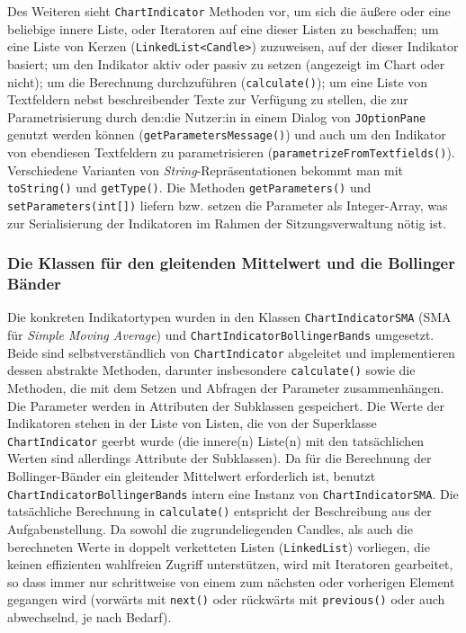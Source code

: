 \documentclass[fontsize=12pt, paper=a4, pagesize=auto, twoside=false, DIV=11, draft=false]{scrartcl}
\begin{document}
Des Weiteren sieht \texttt{ChartIndicator} Methoden vor, um sich die äußere oder eine beliebige innere Liste, oder Iteratoren auf eine dieser Listen zu beschaffen; um eine Liste von Kerzen (\texttt{LinkedList<Candle>}) zuzuweisen, auf der dieser Indikator basiert; um den Indikator aktiv oder passiv zu setzen (angezeigt im Chart oder nicht); um die Berechnung durchzuführen (\texttt{calculate()}); um eine Liste von Textfeldern nebst beschreibender Texte zur Verfügung zu stellen, die zur Parametrisierung durch den:die Nutzer:in in einem Dialog von \texttt{JOptionPane} genutzt werden können (\texttt{getParametersMessage()}) und auch um den Indikator von ebendiesen Textfeldern zu parametrisieren (\texttt{para\-me\-trize\-From\-Text\-fields()}). Verschiedene Varianten von \textit{String}-Repräsentationen bekommt man mit \texttt{toString()} und \texttt{getType()}. Die Methoden \texttt{getParameters()} und \texttt{setParameters(int[])} liefern bzw. setzen die Parameter als Integer-Array, was zur Serialisierung der Indikatoren im Rahmen der Sitzungsverwaltung nötig ist. 

\subsubsection{Die Klassen für den gleitenden Mittelwert und die Bollinger Bänder}
Die konkreten Indikatortypen wurden in den Klassen \texttt{ChartIndicatorSMA} (SMA für \textit{Simple Moving Average}) und \texttt{ChartIndicatorBollingerBands} umgesetzt. Beide sind selbstverständlich von \texttt{ChartIndicator} abgeleitet und implementieren dessen abstrakte Methoden, darunter insbesondere \texttt{calculate()} sowie die Methoden, die mit dem Setzen und Abfragen der Parameter zusammenhängen. Die Parameter werden in Attributen der Subklassen gespeichert. Die Werte der Indikatoren stehen in der Liste von Listen, die von der Superklasse \texttt{ChartIndicator} geerbt wurde (die \glqq innere(n)\grqq{} Liste(n) mit den tatsächlichen Werten sind allerdings Attribute der Subklassen). Da für die Berechnung der Bollinger-Bänder ein gleitender Mittelwert erforderlich ist, benutzt \texttt{ChartIndicatorBollingerBands} intern eine Instanz von \texttt{ChartIndicatorSMA}. Die tatsächliche Berechnung in \texttt{calculate()} entspricht der Beschreibung aus der Aufgabenstellung. Da sowohl die zugrundeliegenden Candles, als auch die berechneten Werte in doppelt verketteten Listen (\texttt{LinkedList}) vorliegen, die keinen effizienten wahlfreien Zugriff unterstützen, wird mit Iteratoren gearbeitet, so dass immer nur schrittweise von einem zum nächsten oder vorherigen Element gegangen wird (vorwärts mit \texttt{next()} oder rückwärts mit \texttt{previous()} oder auch abwechselnd, je nach Bedarf). 
\end{document}
